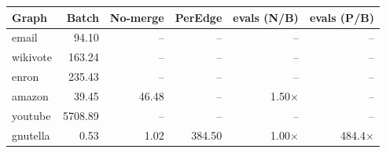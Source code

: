 \begin{tabular}{lrrrrr}
\toprule
Graph & Batch & No-merge & PerEdge & evals (N/B) & evals (P/B) \\
\midrule
email & 94.10 & -- & -- & -- & -- \\
wikivote & 163.24 & -- & -- & -- & -- \\
enron & 235.43 & -- & -- & -- & -- \\
amazon & 39.45 & 46.48 & -- & 1.50$\times$ & -- \\
youtube & 5708.89 & -- & -- & -- & -- \\
gnutella & 0.53 & 1.02 & 384.50 & 1.00$\times$ & 484.4$\times$ \\
\bottomrule
\end{tabular}
